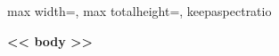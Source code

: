 \documentclass[10pt]{memoir}
\begin{document}
\noindent%
\begin{minipage}[c][\textheight][c]{\textwidth}
  \centering
  \begin{adjustbox}{max width=\textwidth, max totalheight=\textheight, keepaspectratio}
    \begin{minipage}{\textwidth}
      \centering\Large\bfseries << body >>
    \end{minipage}
  \end{adjustbox}
\end{minipage}
\end{document}
